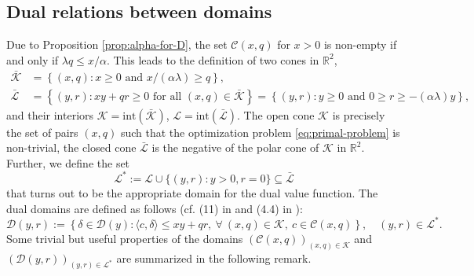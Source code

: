 \documentclass[11pt, oneside]{article}   	%
\theoremstyle{plain}
\theoremstyle{definition}
\theoremstyle{remark}
\begin{document}

\subsection{Dual relations between domains}\label{sec:dual-rel}
Due to Proposition \ref{prop:alpha-for-D}, the set $\mathcal{C}(x,q)$ for $x>0$ is non-empty if and only if $\lambda q\leq x/\alpha$.
This leads to the definition of two cones in $\mathbb{R}^2$,
\begin{equation*}
\begin{aligned}
\bar{\mathcal{K}}&=\left\{(x,q): x\geq 0 \text{ and } x/(\alpha\lambda)\geq  q\right\},\\
\bar{\mathcal{L}}&=\left\{(y,r): xy+qr\geq 0\text{ for all }(x,q)\in\bar{\mathcal{K}}\right\}=\left\{(y,r):y\geq 0 \text{ and }  0\geq r\geq -(\alpha\lambda) y\right\},
\end{aligned}
\end{equation*}
and their interiors $\mathcal{K}=\text{int}(\bar{\mathcal{K}})$, $\mathcal{L}=\text{int}(\bar{\mathcal{L}})$. The open cone $\mathcal{K}$ is precisely the set of pairs $(x,q)$ such that the optimization problem \eqref{eq:primal-problem} is non-trivial, the closed cone $\bar{\mathcal{L}}$ is the negative of the polar cone of $\mathcal{K}$ in $\mathbb{R}^2$. Further, we define the set
$$\mathcal{L}^*:=\mathcal{L}\cup\{(y,r):y>0,r=0\}\subseteq\bar{\mathcal{L}}$$
that turns out to be the appropriate domain for the dual value function. The dual domains are defined as follows (cf. (11) in \cite{hug-kramkov} and (4.4) in \cite{yu}):
\begin{equation*}
\mathcal{D}(y,r):=\left\{\delta\in\mathcal{D}(y):\langle c,\delta \rangle\leq xy+qr,\ \forall \ (x,q)\in\mathcal{K},\ c\in\mathcal{C}(x,q)\right\}, \quad (y,r)\in\mathcal{L}^*.
\end{equation*}
Some trivial but useful properties of the domains $(\mathcal{C}(x,q))_{(x,q)\in\mathcal{K}}$ and $(\mathcal{D}(y,r))_{(y,r)\in\mathcal{L}^*}$ are summarized in the following remark.
\end{document}
